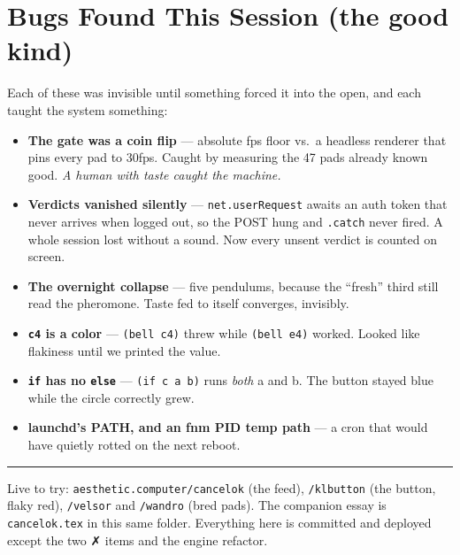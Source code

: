 \documentclass[10pt,letterpaper,twocolumn]{article}
\begin{document}
\section{Bugs Found This Session (the good kind)}

Each of these was invisible until something forced it into the open, and each taught the system something:
\begin{itemize}
  \item \textbf{The gate was a coin flip} --- absolute fps floor vs.\ a headless renderer that pins every pad to 30fps. Caught by measuring the 47 pads already known good. \emph{A human with taste caught the machine.}
  \item \textbf{Verdicts vanished silently} --- \texttt{net.userRequest} awaits an auth token that never arrives when logged out, so the POST hung and \texttt{.catch} never fired. A whole session lost without a sound. Now every unsent verdict is counted on screen.
  \item \textbf{The overnight collapse} --- five pendulums, because the ``fresh'' third still read the pheromone. Taste fed to itself converges, invisibly.
  \item \textbf{\texttt{c4} is a color} --- \texttt{(bell c4)} threw while \texttt{(bell e4)} worked. Looked like flakiness until we printed the value.
  \item \textbf{\texttt{if} has no \texttt{else}} --- \texttt{(if c a b)} runs \emph{both} a and b. The button stayed blue while the circle correctly grew.
  \item \textbf{launchd's PATH, and an fnm PID temp path} --- a cron that would have quietly rotted on the next reboot.
\end{itemize}

\vspace{0.5em}
\hrule
\vspace{0.4em}
{\footnotesize\color{acgray}\noindent Live to try: \texttt{aesthetic.computer/cancelok} (the feed), \texttt{/klbutton} (the button, flaky red), \texttt{/velsor} and \texttt{/wandro} (bred pads). The companion essay is \texttt{cancelok.tex} in this same folder. Everything here is committed and deployed except the two ✗ items and the engine refactor.}
\end{document}
